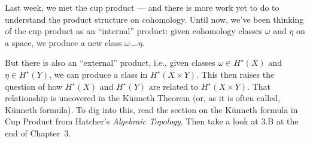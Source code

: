 \documentclass{homework}
\author{Jim Fowler}
\date{Week 7: K\"unneth}
\begin{document}
\maketitle

Last week, we met the cup product --- and there is more work yet to do
to understand the product structure on cohomology.  Until now, we've
been thinking of the cup product as an ``internal'' product: given
cohomology classes $\omega$ and $\eta$ on a space, we produce a new
class $\omega \smile \eta$.

But there is also an ``external'' product, i.e., given classes $\omega
\in H^\star(X)$ and $\eta \in H^\star(Y)$, we can produce a class in
$H^\star(X \times Y)$.  This then raises the question of how
$H^\star(X)$ and $H^\star(Y)$ are related to $H^\star(X \times Y)$.
That relationship is uncovered in the K\"unneth Theorem (or, as it is
often called, K\"unneth formula).  To dig into this, read the section
on the K\"unneth formula in  Cup Product from
Hatcher's \textit{Algebraic Topology}.  Then take a look at
\textsection 3.B at the end of Chapter~3.
\end{document}
